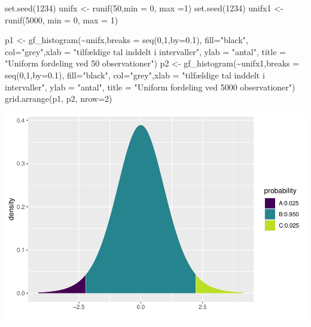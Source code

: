 \documentclass[
]{article}
\newenvironment{Shaded}{\begin{snugshade}}{\end{snugshade}}
\newcommand{\AttributeTok}[1]{\textcolor[rgb]{0.77,0.63,0.00}{#1}}
\newcommand{\DecValTok}[1]{\textcolor[rgb]{0.00,0.00,0.81}{#1}}
\newcommand{\FloatTok}[1]{\textcolor[rgb]{0.00,0.00,0.81}{#1}}
\newcommand{\FunctionTok}[1]{\textcolor[rgb]{0.00,0.00,0.00}{#1}}
\newcommand{\NormalTok}[1]{#1}
\newcommand{\OtherTok}[1]{\textcolor[rgb]{0.56,0.35,0.01}{#1}}
\newcommand{\SpecialCharTok}[1]{\textcolor[rgb]{0.00,0.00,0.00}{#1}}
\newcommand{\StringTok}[1]{\textcolor[rgb]{0.31,0.60,0.02}{#1}}
\begin{document}
\begin{Shaded}
\begin{Highlighting}[]
\FunctionTok{set.seed}\NormalTok{(}\DecValTok{1234}\NormalTok{)}
\NormalTok{unifx }\OtherTok{\textless{}{-}} \FunctionTok{runif}\NormalTok{(}\DecValTok{50}\NormalTok{,}\AttributeTok{min =} \DecValTok{0}\NormalTok{, }\AttributeTok{max =}\DecValTok{1}\NormalTok{)}
\FunctionTok{set.seed}\NormalTok{(}\DecValTok{1234}\NormalTok{)}
\NormalTok{unifx1 }\OtherTok{\textless{}{-}} \FunctionTok{runif}\NormalTok{(}\DecValTok{5000}\NormalTok{, }\AttributeTok{min =} \DecValTok{0}\NormalTok{, }\AttributeTok{max =} \DecValTok{1}\NormalTok{)}

\NormalTok{p1 }\OtherTok{\textless{}{-}} \FunctionTok{gf\_histogram}\NormalTok{(}\SpecialCharTok{\textasciitilde{}}\NormalTok{unifx,}\AttributeTok{breaks =} \FunctionTok{seq}\NormalTok{(}\DecValTok{0}\NormalTok{,}\DecValTok{1}\NormalTok{,}\AttributeTok{by=}\FloatTok{0.1}\NormalTok{), }\AttributeTok{fill=}\StringTok{"black"}\NormalTok{, }\AttributeTok{col=}\StringTok{"grey"}\NormalTok{,}\AttributeTok{xlab =} \StringTok{"tilfældige tal inddelt i intervaller"}\NormalTok{, }\AttributeTok{ylab =} \StringTok{"antal"}\NormalTok{, }\AttributeTok{title =} \StringTok{"Uniform fordeling ved 50 observationer"}\NormalTok{)}
\NormalTok{p2 }\OtherTok{\textless{}{-}} \FunctionTok{gf\_histogram}\NormalTok{(}\SpecialCharTok{\textasciitilde{}}\NormalTok{unifx1,}\AttributeTok{breaks =} \FunctionTok{seq}\NormalTok{(}\DecValTok{0}\NormalTok{,}\DecValTok{1}\NormalTok{,}\AttributeTok{by=}\FloatTok{0.1}\NormalTok{), }\AttributeTok{fill=}\StringTok{"black"}\NormalTok{, }\AttributeTok{col=}\StringTok{"grey"}\NormalTok{,}\AttributeTok{xlab =} \StringTok{"tilfældige tal inddelt i intervaller"}\NormalTok{, }\AttributeTok{ylab =} \StringTok{"antal"}\NormalTok{, }\AttributeTok{title =} \StringTok{"Uniform fordeling ved 5000 observationer"}\NormalTok{)}
\FunctionTok{grid.arrange}\NormalTok{(p1, p2, }\AttributeTok{nrow=}\DecValTok{2}\NormalTok{)}
\end{Highlighting}
\end{Shaded}

\includegraphics{TP2_files/figure-latex/unnamed-chunk-12-1.pdf}
\end{document}
